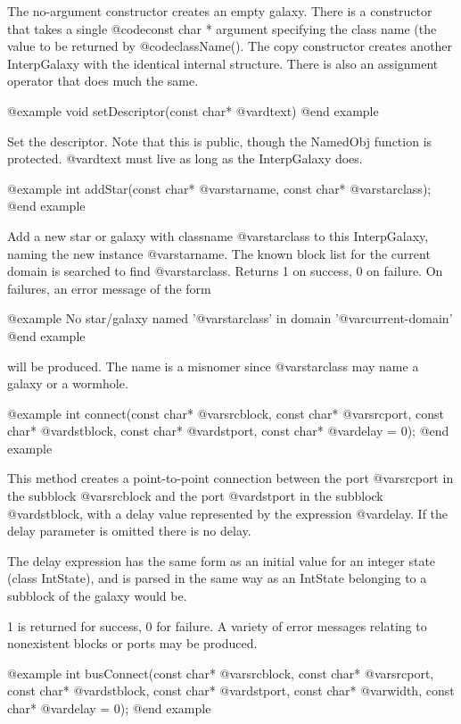 The no-argument constructor creates an empty galaxy.  There is a
constructor that takes a single @code{const char *} argument
specifying the class name (the value to be returned by @code{className()}.
The copy constructor creates another InterpGalaxy with the identical
internal structure.  There is also an assignment operator that does
much the same.

@example
void setDescriptor(const char* @var{dtext})
@end example

Set the descriptor.  Note that this is public, though the NamedObj
function is protected. @var{dtext} must live as long as the InterpGalaxy
does.

@example
int addStar(const char* @var{starname}, const char* @var{starclass});
@end example

Add a new star or galaxy with classname @var{starclass} to this
InterpGalaxy, naming the new instance @var{starname}.  The known block
list for the current domain is searched to find @var{starclass}.
Returns 1 on success, 0 on failure.  On failures, an error message
of the form

@example
No star/galaxy named '@var{starclass}' in domain '@var{current-domain}'
@end example

will be produced.  The name is a misnomer since @var{starclass} may
name a galaxy or a wormhole.

@example
int connect(const char* @var{srcblock}, const char* @var{srcport},
            const char* @var{dstblock}, const char* @var{dstport},
            const char* @var{delay} = 0);
@end example

This method creates a point-to-point connection between the port
@var{srcport} in the subblock @var{srcblock} and the port @var{dstport}
in the subblock @var{dstblock}, with a delay value represented by
the expression @var{delay}.
If the delay parameter is omitted there is no delay.

The delay expression has the same form as an initial value for an
integer state (class IntState), and is parsed in the same way as
an IntState belonging to a subblock of the galaxy would be.

1 is returned for success, 0 for failure.
A variety of error messages relating to nonexistent blocks or ports
may be produced.

@example
int busConnect(const char* @var{srcblock}, const char* @var{srcport},
               const char* @var{dstblock}, const char* @var{dstport},
               const char* @var{width}, const char* @var{delay} = 0);
@end example

